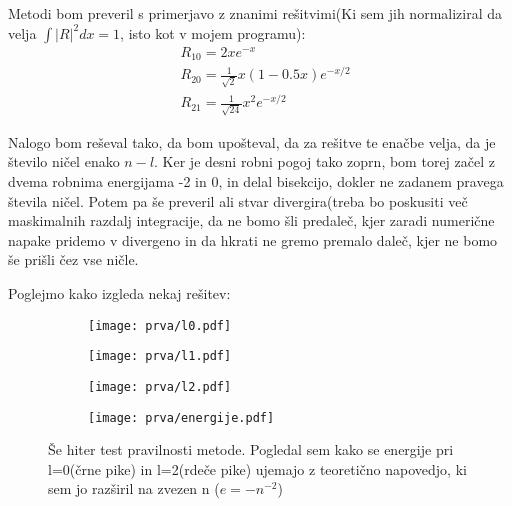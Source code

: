 \documentclass{article}
\begin{document}
Metodi bom preveril s primerjavo z znanimi rešitvimi(Ki sem jih normaliziral da velja $\int |R|^2 dx = 1$, isto kot v mojem programu):
\begin{align*}
&R_{10} = 2 x e^{-x} \\
&R_{20} = \frac{1}{\sqrt{2}}x(1-0.5x)e^{-x/2} \\
&R_{21} = \frac{1}{\sqrt{24}}x^2 e^{-x/2}
\end{align*}

Nalogo bom reševal tako, da bom upošteval, da za rešitve te enačbe velja, da je število ničel enako $n-l$. Ker je desni robni pogoj tako zoprn, bom torej začel z dvema robnima energijama -2 in 0, in delal bisekcijo, dokler ne zadanem pravega števila ničel. Potem pa še preveril ali stvar divergira(treba bo poskusiti več maskimalnih razdalj integracije, da ne bomo šli predaleč, kjer zaradi numerične napake pridemo v divergeno in da hkrati ne gremo premalo daleč, kjer ne bomo še prišli čez vse ničle.

Poglejmo kako izgleda nekaj rešitev:

\begin{figure}[H]
\centering
\begin{subfigure}{0.85\textwidth}
\texttt{[image: prva/l0.pdf]}
\end{subfigure}
\end{figure}

\begin{figure}[H]
\centering
\begin{subfigure}{0.85\textwidth}
\texttt{[image: prva/l1.pdf]}
\end{subfigure}
\end{figure}

\begin{figure}[H]
\centering
\begin{subfigure}{.9\textwidth}
\texttt{[image: prva/l2.pdf]}
\end{subfigure}
\end{figure}

\begin{figure}[H]
\centering
\begin{subfigure}{.7\textwidth}
\texttt{[image: prva/energije.pdf]}
\end{subfigure}
\caption*{Še hiter test pravilnosti metode. Pogledal sem kako se energije pri l=0(črne pike) in l=2(rdeče pike) ujemajo z teoretično napovedjo, ki sem jo razširil na zvezen n ($e=-n^{-2}$)}
\end{figure}
\end{document}
